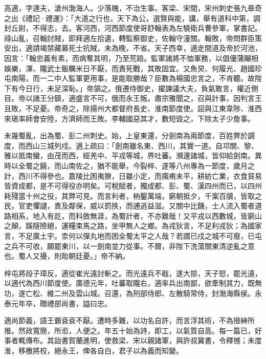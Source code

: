 
\begin{pinyinscope}

 高適，字達夫，滄州渤海人。少落魄，不治生事。客梁、宋間，宋州刺史張九皋奇之出《禮記·禮運》：「大道之行也，天下為公，選賢與能，講，舉有道科中第，調封丘尉，不得志，去。客河西，河西節度使哥舒翰表為左驍衛兵曹參軍，掌書記。祿山亂，召翰討賊，即拜適左拾遺，轉監察御史，佐翰守潼關。翰敗，帝問群臣策安出，適請竭禁藏募死士抗賊，未為晚，不省。天子西幸，適走間道及帝於河池，因言：「翰忠義有素，而病奪其明，乃至荒踣。監軍諸將不恤軍務，以倡優蒲飀相娛樂，渾、隴武士飯糲米日不厭，而責死戰，其敗固宜。又魚炅、何履光、趙國珍屯南陽，而一二中人監軍更用事，是能取勝哉？臣數為楊國忠言之，不肯聽。故陛下有今日行，未足深恥。」帝頷之。俄遷侍御史，擢諫議大夫，負氣敢言，權近側目。帝以諸王分鎮，適盛言不可，俄而永王叛。肅宗雅聞之，召與計事，因判言王且敗，不足憂。帝奇之，除揚州大都督府長史、淮南節度使。詔與江東韋陟、淮西來瑱率師會安陸，方濟師而王敗。李輔國惡其才，數短毀之，下除太子少詹事。



 未幾蜀亂，出為蜀、彭二州刺史。始，上皇東還，分劍南為兩節度，百姓弊於調度，而西山三城列戍。適上疏曰：「劍南雖名東、西川，其實一道。自邛關、黎、雅以抵南蠻，由茂而西，經羌中、平戎等城，界吐蕃。瀕邊諸城，皆仰給劍南。異時以全蜀之饒，而山南佐之，猶不能舉，今裂梓、遂等八州專為一節度，歲月之計，西川不得參也。嘉陵比困夷獠，日雖小定，而痍痏未平，耕紡亡業，衣食貿易皆資成都，是不可得役亦明矣。可稅賦者，獨成都、彭、蜀、漢四州而已，以四州耗殘當十州之役，其弊可見。而言利者，枘鑿萬端，窮朝抵夕，千案百牘，皆取之民，官吏懼譴，責及鄰保，威以罰抶，而逋逃益滋。又關中比饑，士人流入蜀者道路相系，地入有訖，而科斂無涯，為蜀計者，不亦難哉！又平戎以西數城，皆窮山之顛，蹊隧險絕，運糧束馬之路，坐甲無人之鄉。為戎狄言，不足利戎狄；為國家言，不足廣土宇。柰何以彈丸地而困全蜀太平之人哉？若謂已戍之城不可廢，已屯之兵不可收，願罷東川，以一劍南並力從事。不爾，非陛下洗蕩關東清逆亂之意也。蜀人又擾，則貽朝廷憂。」帝不納。



 梓屯將段子璋反，適從崔光遠討斬之。而光遠兵不戢，遂大掠，天子怒，罷光遠，以適代為西川節度使。廣德元年，吐蕃取隴右，適率兵出南鄙，欲牽制其力，既無功，遂亡松、維二州及雲山城。召還，為刑部侍郎、左散騎常侍，封渤海縣侯。永泰元年卒，贈禮部尚書，謚曰忠。



 適尚節義，語王霸袞袞不厭。遭時多難，以功名自許，而言浮其術，不為搢紳所推。然政寬簡，所涖，人便之。年五十始為詩，即工，以氣質自高。每一篇已，好事者輒傳布。其詒書賀蘭進明，使救梁、宋以親諸軍，與許叔冀書，令釋憾；未度淮，移檄將校，絕永王，俾各自白，君子以為義而知變。




\end{pinyinscope}
